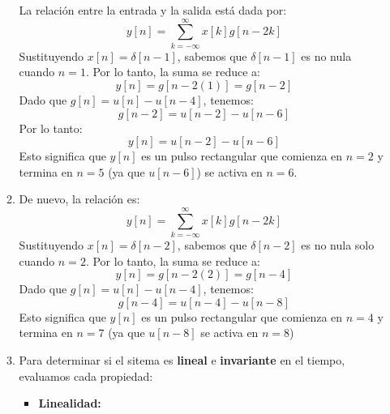 \begin{enumerate}[label=\color{red}\textbf{\arabic*)}]
\begin{enumerate}[label=\color{red}\textbf{\alph*)}]
        La relación entre la entrada y la salida está dada por: \[
          y[n]=\sum_{k=-\infty}^{\infty} x[k]g[n-2k]
        \] 
        Sustituyendo $x[n]=\delta[n-1]$, sabemos que  $\delta[n-1]$ es no nula cuando  $n=1$. Por lo tanto, la suma se reduce a:  \[
          y[n]=g[n-2(1)]=g[n-2]
        \] 
        Dado que $g[n]=u[n]-u[n-4]$, tenemos:  \[
          g[n-2]=u[n-2]-u[n-6]
        \] 
        Por lo tanto: \[
          y[n]=u[n-2]-u[n-6]
        \] 
        Esto significa que $y[n]$ es un pulso rectangular que comienza en  $n=2$ y termina en  $n=5$ (ya que $u[n-6]$) se activa en $n=6$.
         \begin{center}
        \end{center}
      \item {} 

        De nuevo, la relación es: \[
          y[n]=\sum_{k=-\infty}^{\infty} x[k]g[n-2k]
        \] 
        Sustituyendo $x[n]=\delta[n-2]$, sabemos que  $\delta[n-2]$ es no nula solo cuando  $n=2$. Por lo tanto, la suma se reduce a: \[
          y[n]=g[n-2(2)]=g[n-4]
        \] 
        Dado que $g[n]=u[n]-u[n-4]$, tenemos:  \[
          g[n-4]=u[n-4]-u[n-8]
        \] 
        Esto significa que $y[n]$ es un pulso rectangular que comienza en $n=4$ y termina en $n=7$ (ya que $u[n-8]$ se activa en $n=8$)
        \begin{center}
        \end{center}

      \item {} 

        Para determinar si el sitema es \textbf{lineal} e \textbf{invariante} en el tiempo, evaluamos cada propiedad:
        \begin{itemize}[label=\textbullet]
          \item \textbf{Linealidad:}


\end{itemize}
\end{enumerate}
\end{enumerate}

